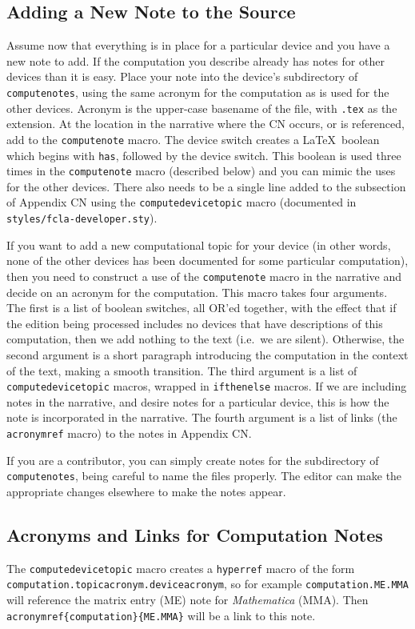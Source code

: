 \documentclass[12pt]{article}
\newcommand{\sourcefile}[1]{{\tt#1}}
\newcommand{\rawtex}[1]{{\tt#1}}
\newcommand{\acronymref}[2]{\MakeUppercase#1 #2}
\begin{document}
\subsection*{Adding a New Note to the Source}
%
Assume now that everything is in place for a particular device and you have a new note to add.  If the computation you describe already has notes for other devices than it is easy.  Place your note into the device's subdirectory of \sourcefile{computenotes}, using the same acronym for the computation as is used for the other devices.  Acronym is the upper-case basename of the file, with \sourcefile{.tex} as the extension.  At the location in the narrative where the CN occurs, or is referenced, add to the \rawtex{computenote} macro.  The device switch creates a \LaTeX\ boolean which begins with \rawtex{has}, followed by the device switch.  This boolean is used three times in the \rawtex{computenote} macro (described below) and you can mimic the uses for the other devices.  There also needs to be a single line added to the subsection of \acronymref{appendix}{CN} using the \rawtex{computedevicetopic} macro (documented in \sourcefile{styles/fcla-developer.sty}).\par
%
If you want to add a new computational topic for your device (in other words, none of the other devices has been documented for some particular computation), then you need to construct a use of the \rawtex{computenote} macro in the narrative and decide on an acronym for the computation.  This macro takes four arguments.  The first is a list of boolean switches, all OR'ed together, with the effect that if the edition being processed includes no devices that have descriptions of this computation, then we add nothing to the text (i.e.\ we are silent).  Otherwise, the second argument is a short paragraph introducing the computation in the context of the text, making a smooth transition.  The third argument is a list of \rawtex{computedevicetopic} macros, wrapped in \rawtex{ifthenelse} macros.  If we are including notes in the narrative, and desire notes for a particular device, this is how the note is incorporated in the narrative.  The fourth argument is a list of links (the \rawtex{acronymref} macro) to the notes in \acronymref{appendix}{CN}.\par
%
If you are a contributor, you can simply create notes for the subdirectory of \sourcefile{computenotes}, being careful to name the files properly.  The editor can make the appropriate changes elsewhere to make the notes appear.
%
\subsection*{Acronyms and Links for Computation Notes}
%
The \rawtex{computedevicetopic} macro creates a \rawtex{hyperref} macro of the form \rawtex{computation.topicacronym.deviceacronym}, so for example \rawtex{computation.ME.MMA} will reference the matrix entry (ME) note for {\sl Mathematica} (MMA).  Then \rawtex{acronymref\{computation\}\{ME.MMA\}} will be a link to this note.
%
\end{document}
